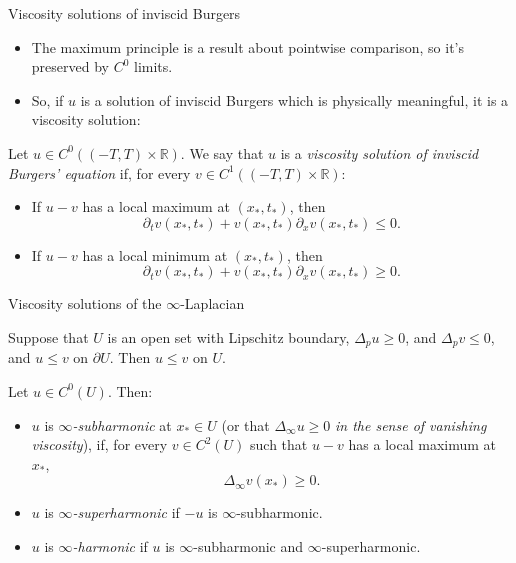 \documentclass[10pt]{beamer}
\newcommand{\RR}{\mathbb{R}}
\begin{document}
\begin{frame}{Viscosity solutions of inviscid Burgers}
\begin{itemize}
\item The maximum principle is a result about pointwise comparison, so it's preserved by $C^0$ limits. 
\item So, if $u$ is a solution of inviscid Burgers which is physically meaningful, it is a viscosity solution: 
\end{itemize}

\begin{definition}
Let $u \in C^0((-T, T) \times \RR)$. We say that $u$ is a \emph{viscosity solution of inviscid Burgers' equation} if, for every $v \in C^1((-T, T) \times \RR)$:  
\begin{itemize}
\item If $u - v$ has a local maximum at $(x_*, t_*)$, then
$$\partial_t v(x_*, t_*) + v(x_*, t_*) \partial_x v(x_*, t_*) \leq 0.$$
\item If $u - v$ has a local minimum at $(x_*, t_*)$, then 
$$\partial_t v(x_*, t_*) + v(x_*, t_*) \partial_x v(x_*, t_*) \geq 0.$$
\end{itemize}
\end{definition}
\end{frame}

\begin{frame}{Viscosity solutions of the $\infty$-Laplacian}
\begin{lemma}
Suppose that $U$ is an open set with Lipschitz boundary, $\Delta_p u \geq 0$, and $\Delta_p v \leq 0$, and $u \leq v$ on $\partial U$.
Then $u \leq v$ on $U$.
\end{lemma}   
 
\begin{definition}
Let $u \in C^0(U)$. Then:
\begin{itemize}
\item $u$ is \emph{$\infty$-subharmonic} at $x_* \in U$ (or that $\Delta_\infty u \geq 0$ \emph{in the sense of vanishing viscosity}), if, for every $v \in C^2(U)$ such that $u - v$ has a local maximum at $x_*$,
$$\Delta_\infty v(x_*) \geq 0.$$
\item $u$ is \emph{$\infty$-superharmonic} if $-u$ is $\infty$-subharmonic.
\item $u$ is \emph{$\infty$-harmonic} if $u$ is $\infty$-subharmonic and $\infty$-superharmonic.
\end{itemize}
\end{definition}
\end{frame}
\end{document}
